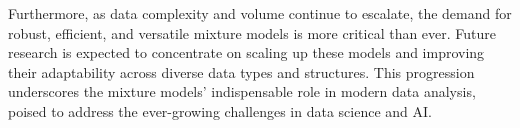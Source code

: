 \documentclass{article}
\begin{document}
Furthermore, as data complexity and volume continue to escalate, the demand for robust, efficient, and versatile mixture models is more critical than ever. Future research is expected to concentrate on scaling up these models and improving their adaptability across diverse data types and structures. This progression underscores the mixture models' indispensable role in modern data analysis, poised to address the ever-growing challenges in data science and AI.


\end{document}
